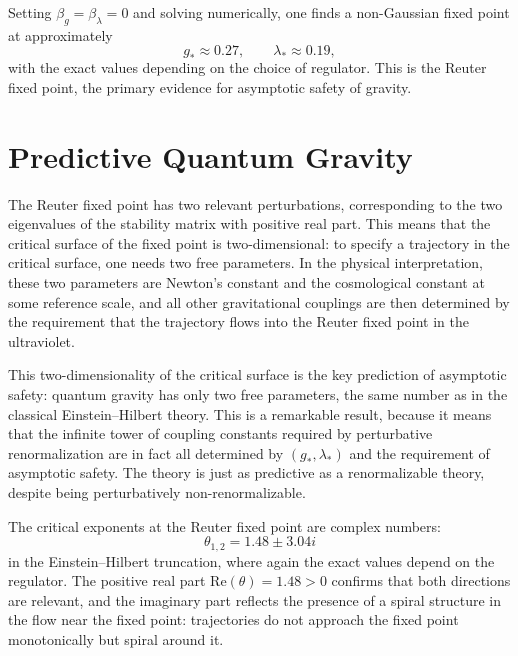 \documentclass[11pt, twoside, openright]{book}
\theoremstyle{dotted}
\theoremstyle{definition}
\begin{document}
Setting $\beta_g = \beta_\lambda = 0$ and solving numerically, one finds a
non-Gaussian fixed point at approximately
\begin{equation}
  g_* \approx 0.27, \qquad \lambda_* \approx 0.19,
  \label{eq:reuter_fp}
\end{equation}
with the exact values depending on the choice of regulator. This is the Reuter
fixed point, the primary evidence for asymptotic safety of gravity.

\section{Predictive Quantum Gravity}

The Reuter fixed point has two relevant perturbations, corresponding to the two
eigenvalues of the stability matrix with positive real part. This means that the
critical surface of the fixed point is two-dimensional: to specify a trajectory in
the critical surface, one needs two free parameters. In the physical interpretation,
these two parameters are Newton's constant and the cosmological constant at some
reference scale, and all other gravitational couplings are then determined by the
requirement that the trajectory flows into the Reuter fixed point in the ultraviolet.

This two-dimensionality of the critical surface is the key prediction of asymptotic
safety: quantum gravity has only two free parameters, the same number as in the
classical Einstein--Hilbert theory. This is a remarkable result, because it means
that the infinite tower of coupling constants required by perturbative renormalization
are in fact all determined by $(g_*, \lambda_*)$ and the requirement of asymptotic
safety. The theory is just as predictive as a renormalizable theory, despite being
perturbatively non-renormalizable.

The critical exponents at the Reuter fixed point are complex numbers:
\begin{equation}
  \theta_{1,2} = 1.48 \pm 3.04 i
  \label{eq:reuter_exponents}
\end{equation}
in the Einstein--Hilbert truncation, where again the exact values depend on the
regulator. The positive real part $\mathrm{Re}(\theta) = 1.48 > 0$ confirms that
both directions are relevant, and the imaginary part reflects the presence of a
spiral structure in the flow near the fixed point: trajectories do not approach
the fixed point monotonically but spiral around it.

\end{document}
